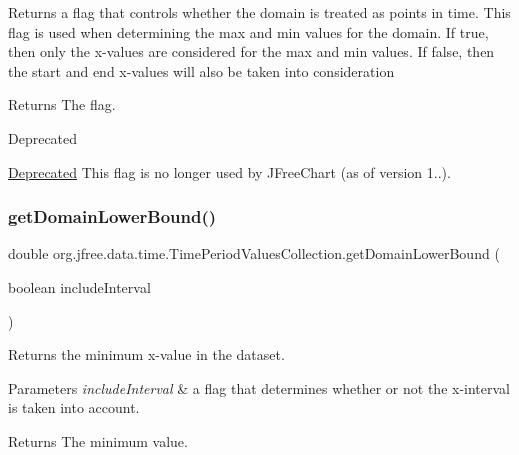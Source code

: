 Returns a flag that controls whether the domain is treated as \textquotesingle{}points in time\textquotesingle{}. This flag is used when determining the max and min values for the domain. If true, then only the x-\/values are considered for the max and min values. If false, then the start and end x-\/values will also be taken into consideration

\begin{DoxyReturn}{Returns}
The flag.
\end{DoxyReturn}
\begin{DoxyRefDesc}{Deprecated}
\item[\mbox{\hyperlink{deprecated__deprecated000277}{Deprecated}}]This flag is no longer used by J\+Free\+Chart (as of version 1..). \end{DoxyRefDesc}
\mbox{\label{classorg_1_1jfree_1_1data_1_1time_1_1_time_period_values_collection_adfb18911920ee6e9f74eae3357741461}} 
\subsubsection{\texorpdfstring{get\+Domain\+Lower\+Bound()}{getDomainLowerBound()}}
{\footnotesize\ttfamily double org.\+jfree.\+data.\+time.\+Time\+Period\+Values\+Collection.\+get\+Domain\+Lower\+Bound (\begin{DoxyParamCaption}\item[{boolean}]{include\+Interval }\end{DoxyParamCaption})}

Returns the minimum x-\/value in the dataset.


\begin{DoxyParams}{Parameters}
{\em include\+Interval} & a flag that determines whether or not the x-\/interval is taken into account.\\
\hline
\end{DoxyParams}
\begin{DoxyReturn}{Returns}
The minimum value. 
\end{DoxyReturn}


